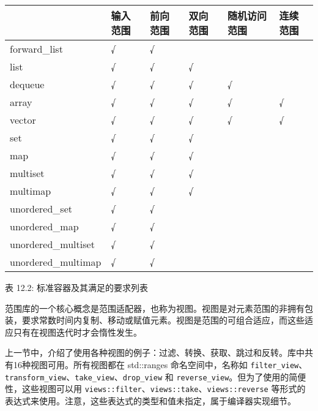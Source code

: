 \begin{longtable}{|l|l|l|l|l|l|}
\hline
\textbf{} & \textbf{输入范围} & \textbf{前向范围} & \textbf{双向范围} & \textbf{随机访问范围} & \textbf{连续范围} \\ \hline
\endfirsthead
%
\endhead
%
forward\_list       & √ & √ &   &   &   \\ \hline
list                & √ & √ & √ &   &   \\ \hline
dequeue             & √ & √ & √ & √ &   \\ \hline
array               & √ & √ & √ & √ & √ \\ \hline
vector              & √ & √ & √ & √ & √ \\ \hline
set                 & √ & √ & √ &   &   \\ \hline
map                 & √ & √ & √ &   &   \\ \hline
multiset            & √ & √ & √ &   &   \\ \hline
multimap            & √ & √ & √ &   &   \\ \hline
unordered\_set      & √ & √ &   &   &   \\ \hline
unordered\_map      & √ & √ &   &   &   \\ \hline
unordered\_multiset & √ & √ &   &   &   \\ \hline
unordered\_multimap & √ & √ &   &   &   \\ \hline
\end{longtable}

\begin{center}
表 12.2: 标准容器及其满足的要求列表
\end{center}

范围库的一个核心概念是范围适配器，也称为视图。视图是对元素范围的非拥有包装，要求常数时间内复制、移动或赋值元素。视图是范围的可组合适应，而这些适应只有在视图迭代时才会惰性发生。

上一节中，介绍了使用各种视图的例子：过滤、转换、获取、跳过和反转。库中共有16种视图可用。所有视图都在 std::ranges 命名空间中，名称如 \verb|filter_view|、\verb|transform_view|、\verb|take_view|、\verb|drop_view| 和 \verb|reverse_view|。但为了使用的简便性，这些视图可以用 \verb|views::filter|、\verb|views::take|、\verb|views::reverse| 等形式的表达式来使用。注意，这些表达式的类型和值未指定，属于编译器实现细节。

